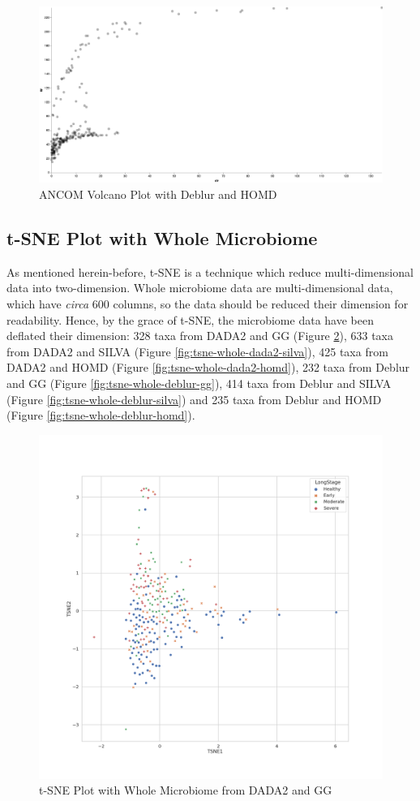 \documentclass[a4paper]{article}
\begin{document}
            \begin{figure}[p]
                \centering
                \includegraphics[width=0.8 \linewidth]{figures/ANCOM/Deblur.homd.png}
                \caption{ANCOM Volcano Plot with Deblur and HOMD}
                \label{fig:volcano-deblur-homd}
            \end{figure}

        \subsection{t-SNE Plot with Whole Microbiome}
            As mentioned herein-before, t-SNE is a technique which reduce multi-dimensional data into two-dimension. Whole microbiome data are multi-dimensional data, which have \textit{circa} 600 columns, so the data should be reduced their dimension for readability. Hence, by the grace of t-SNE, the microbiome data have been deflated their dimension: 328 taxa from DADA2 and GG (Figure \ref{fig:tsne-whole-dada2-gg}), 633 taxa from DADA2 and SILVA (Figure \ref{fig:tsne-whole-dada2-silva}), 425 taxa from DADA2 and HOMD (Figure \ref{fig:tsne-whole-dada2-homd}), 232 taxa from Deblur and GG (Figure \ref{fig:tsne-whole-deblur-gg}), 414 taxa from Deblur and SILVA (Figure \ref{fig:tsne-whole-deblur-silva}) and 235 taxa from Deblur and HOMD (Figure \ref{fig:tsne-whole-deblur-homd}).

            \begin{figure}[p]
                \centering
                \includegraphics[width=0.6 \linewidth]{figures/tSNE/Whole/whole.DADA2.gg.png}
                \caption{t-SNE Plot with Whole Microbiome from DADA2 and GG}
                \label{fig:tsne-whole-dada2-gg}
            \end{figure}
\end{document}
